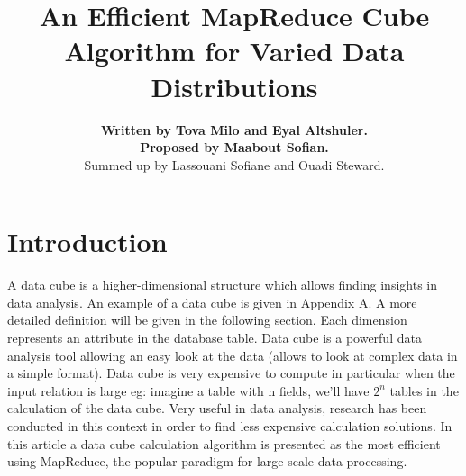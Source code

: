 \documentclass[10pt,journal,compsoc]{IEEEtran}
\begin{document}
%
\title{An Efficient MapReduce Cube Algorithm for Varied Data Distributions}

\author{ \textbf{ Written by Tova Milo and Eyal Altshuler.  \\
Proposed by Maabout Sofian.} \\

Summed up by Lassouani Sofiane and Ouadi Steward.}%



\maketitle


\IEEEdisplaynontitleabstractindextext
\IEEEpeerreviewmaketitle



\section{Introduction}\label{sec:introduction}

A data cube is a higher-dimensional structure which allows finding insights in data analysis. An example of a data cube is given in Appendix A. A more detailed definition will be given in the following section. Each dimension represents an attribute in the database table. Data cube is a powerful data analysis tool allowing an easy look at the data (allows to look at complex data in a simple format). Data cube is very expensive to compute in particular when the input relation is large eg: imagine a table with n fields, we'll have ${2^n}$ tables in the calculation of the data cube. Very useful in data analysis, research has been conducted in this context in order to find less expensive calculation solutions. In this article a data cube calculation algorithm is presented as the most efficient using MapReduce, the popular paradigm for large-scale data processing.
\end{document}

